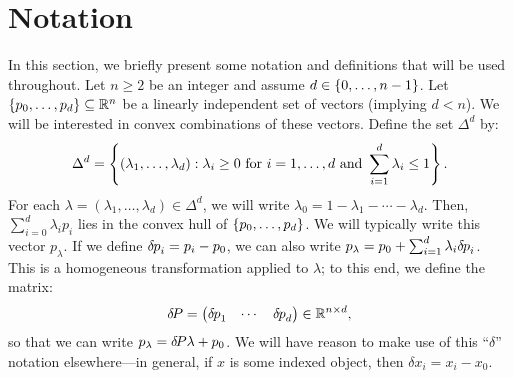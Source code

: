 \documentclass[eikonal.tex]{subfiles}
\begin{document}
\section{Notation}

In this section, we briefly present some notation and definitions that
will be used throughout. Let $n \geq 2$ be an integer and assume
$d \in \left\{0, \hdots, n - 1\right\}$. Let
$\left\{p_0, \hdots, p_d\right\} \subseteq \mathbb{R}^n$ be a linearly independent set
of vectors (implying $d < n$). We will be interested in convex
combinations of these vectors. Define the set $\Delta^d$ by:
\begin{align*}
  \Delta^d = \left\{(\lambda_1, \hdots, \lambda_d) : \lambda_i \geq 0 \mbox{ for } i = 1, \hdots, d \mbox{ and } \sum_{i=1}^d \lambda_i \leq 1\right\}.
\end{align*}
For each $\lambda = (\lambda_1, \hdots, \lambda_d) \in \Delta^d$, we
will write $\lambda_0 = 1 - \lambda_1 - \cdots - \lambda_d$. Then,
$\sum_{i=0}^d \lambda_i p_i$ lies in the convex hull of
$\left\{p_0, \hdots, p_d\right\}$. We will typically write this vector
$p_\lambda$. If we define ${\delta \hspace{-0.08em} p}_i = p_i - p_0$, we can also write
$p_\lambda = p_0 + \sum_{i=1}^d \lambda_i {\delta \hspace{-0.08em} p}_i$. This is a
homogeneous transformation applied to $\lambda$; to this end, we
define the matrix:
\begin{align*}
  {\delta \hspace{-0.14em} P} = \begin{pmatrix} {\delta \hspace{-0.08em} p}_1 & \cdots & {\delta \hspace{-0.08em} p}_d \end{pmatrix} \in \mathbb{R}^{n \times d},
\end{align*}
so that we can write $p_\lambda = {\delta \hspace{-0.14em} P} \lambda + p_0$. We will
have reason to make use of this ``$\delta$'' notation elsewhere---in
general, if $x$ is some indexed object, then $\delta x_i = x_i - x_0$.
\end{document}
